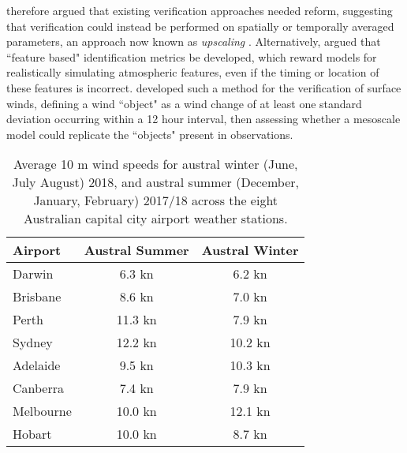 \documentclass{article}
\begin{document}
\citet{mass02} therefore argued that existing verification approaches needed reform, suggesting that verification could instead be performed on spatially or temporally averaged parameters, an approach now known as \textit{upscaling} \citep{ebert08}. Alternatively, \citet{mass02} argued that ``feature based" identification metrics be developed, which reward models for realistically simulating atmospheric features, even if the timing or location of these features is incorrect. \citet{rife05} developed such a method for the verification of surface winds, defining a wind ``object" as a wind change of at least one standard deviation occurring within a 12 hour interval, then assessing whether a mesoscale model could replicate the ``objects" present in observations.

\begin{table}
\begin{center}
\begin{tabular}{l |c|c}
Airport & Austral Summer & Austral Winter \\
\hline
Darwin  & 6.3 kn& 6.2 kn \\
Brisbane  & 8.6 kn& 7.0 kn \\
Perth  & 11.3 kn& 7.9 kn \\
Sydney  & 12.2 kn & 10.2 kn \\
Adelaide  & 9.5 kn & 10.3 kn \\
Canberra  & 7.4 kn & 7.9 kn \\
Melbourne  & 10.0 kn & 12.1 kn \\
Hobart & 10.0 kn & 8.7 kn
\end{tabular}
\caption{Average 10 m wind speeds for austral winter (June, July August) 2018, and austral summer (December, January, February) 2017/18 across the eight Australian capital city airport weather stations.}
\label{Tab:Speeds}
\end{center}
\end{table}




\end{document}
